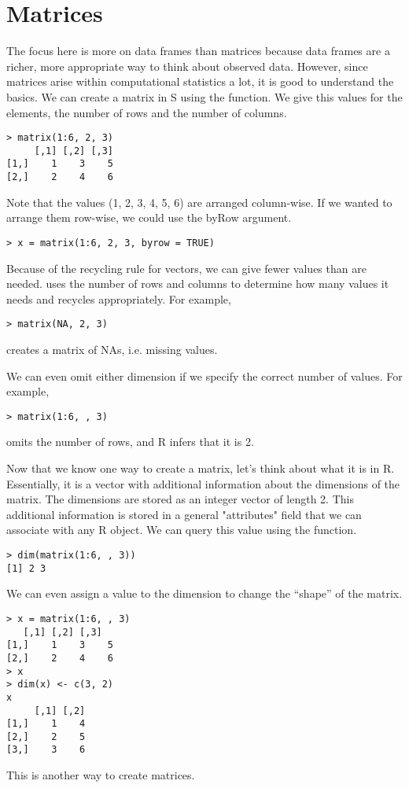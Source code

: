 \section{Matrices}
The focus here is more on data frames than matrices because data
frames are a richer, more appropriate way to think about observed
data. However, since matrices arise within computational statistics a
lot, it is good to understand the basics. We can create a matrix in S
using the  function. We give this values for the
elements, the number of rows and the number of columns.
\begin{verbatim}
> matrix(1:6, 2, 3)
     [,1] [,2] [,3]
[1,]    1    3    5
[2,]    2    4    6
\end{verbatim}
Note that the values (1, 2, 3, 4, 5, 6) are arranged column-wise. If
we wanted to arrange them row-wise, we could use the byRow argument.
\begin{verbatim}
> x = matrix(1:6, 2, 3, byrow = TRUE)
\end{verbatim}
Because of the recycling rule for vectors, we can give fewer values
than are needed.  uses the number of rows and
columns to determine how many values it needs and recycles
appropriately. For example,
\begin{verbatim}
> matrix(NA, 2, 3)
\end{verbatim}
creates a matrix of NAs, i.e. missing values. 

We can even omit either dimension if we specify the correct number of
values. For example,
\begin{verbatim}
> matrix(1:6, , 3)
\end{verbatim}
omits the number of rows, and R infers that it is 2. 

Now that we know one way to create a matrix, let's think about what it
is in R. Essentially, it is a vector with additional information about
the dimensions of the matrix. The dimensions are stored as an integer
vector of length 2. This additional information is stored in a general
"attributes" field that we can associate with any R object. We can
query this value using the  function.
\begin{verbatim}
> dim(matrix(1:6, , 3))
[1] 2 3
\end{verbatim}
We can even assign a value to the dimension to change the ``shape'' of
the matrix.
\begin{verbatim}
> x = matrix(1:6, , 3)
   [,1] [,2] [,3]
[1,]    1    3    5
[2,]    2    4    6
> x
> dim(x) <- c(3, 2)
x
     [,1] [,2]
[1,]    1    4
[2,]    2    5
[3,]    3    6
\end{verbatim}
This is another way to create matrices. 

